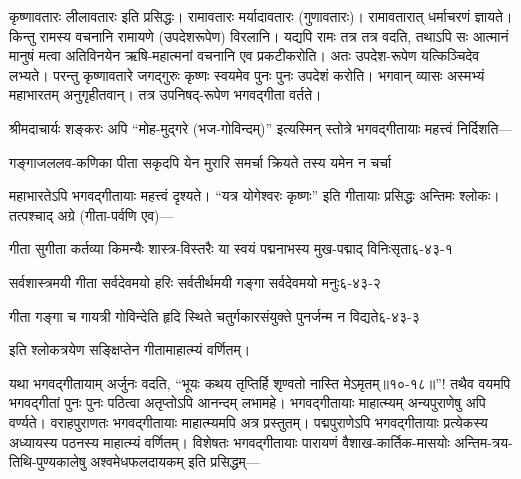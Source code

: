 




कृष्णावतारः लीलावतारः इति प्रसिद्धः। रामावतारः मर्यादावतारः (गुणावतारः)। रामावतारात् धर्माचरणं ज्ञायते। किन्तु रामस्य वचनानि रामायणे (उपदेश\-रूपेण) विरलानि। यद्यपि रामः तत्र तत्र वदति, तथाऽपि सः आत्मानं मानुषं मत्वा अतिविनयेन ऋषि-महात्मनां वचनानि एव प्रकटीकरोति। अतः उपदेश-रूपेण यत्किञ्चिदेव लभ्यते। परन्तु कृष्णावतारे जगद्गुरुः कृष्णः स्वयमेव पुनः पुनः उपदेशं करोति। भगवान् व्यासः अस्मभ्यं महाभारतम् अनुगृहीतवान्। तत्र उपनिषद्-रूपेण भगवद्गीता वर्तते। 

श्रीमदाचार्यः शङ्करः अपि ``मोह-मुद्गरे (भज-गोविन्दम्)'' इत्यस्मिन् स्तोत्रे भगवद्गीतायाः महत्त्वं निर्दिशति---

{गङ्गाजललव-कणिका पीता}
{सकृदपि येन मुरारि समर्चा}
{क्रियते तस्य यमेन न चर्चा}


महाभारतेऽपि भगवद्गीतायाः महत्त्वं दृश्यते। ``यत्र योगेश्वरः कृष्णः'' इति गीतायाः प्रसिद्धः अन्तिमः श्लोकः। तत्पश्चाद् अग्रे (गीता-पर्वणि एव)---

\annotwolineshloka
{गीता सुगीता कर्तव्या किमन्यैः शास्त्र-विस्तरैः}
{या स्वयं पद्मनाभस्य मुख-पद्माद्‌ विनिःसृता}{६-४३-१}

\annotwolineshloka
{सर्वशास्त्रमयी गीता सर्वदेवमयो हरिः}
{सर्वतीर्थमयी गङ्गा सर्वदेवमयो मनुः}{६-४३-२}

\annotwolineshloka
{गीता गङ्गा च गायत्री गोविन्देति हृदि स्थिते}
{चतुर्गकारसंयुक्ते पुनर्जन्म न विद्यते}{६-४३-३}

\noindent इति श्लोकत्रयेण सङ्क्षिप्तेन गीतामाहात्म्यं वर्णितम्।

यथा भगवद्गीतायाम् अर्जुनः वदति, ``भूयः कथय तृप्तिर्हि शृण्वतो नास्ति मेऽमृतम्॥१०-१८॥''! तथैव वयमपि भगवद्गीतां पुनः पुनः पठित्वा अतृप्तोऽपि आनन्दम् लभामहे। भगवद्गीतायाः माहात्म्यम् अन्यपुराणेषु अपि वर्ण्यते। वराहपुराणतः भगवद्गीतायाः माहात्म्यमपि अत्र प्रस्तुतम्। पद्मपुराणेऽपि भगवद्गीतायाः प्रत्येकस्य अध्यायस्य पठनस्य माहात्म्यं वर्णितम्। विशेषतः भगवद्गीतायाः पारायणं वैशाख-कार्तिक-मासयोः अन्तिम-त्रय-तिथि-पुण्यकालेषु अश्वमेधफलदायकम् इति प्रसिद्धम्---

